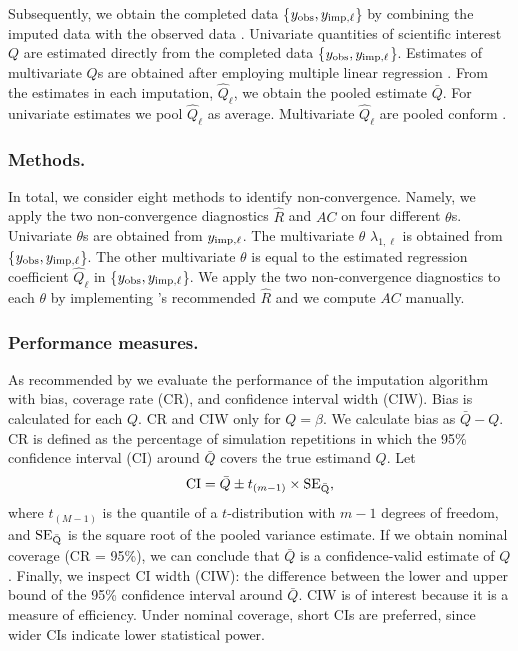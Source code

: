 \documentclass[Royal,times,sageh]{sagej}
\begin{document}
Subsequently, we obtain the completed data \{\(y_{\rm obs}, y_{\rm imp, \ell}\)\} by combining the imputed data with the observed data \citep[function \texttt{mice::complete()};][]{mice}. Univariate quantities of scientific interest \(Q\) are estimated directly from the completed data \{\(y_{\rm obs}, y_{\rm imp, \ell}\)\}. Estimates of multivariate \(Q\)s are obtained after employing multiple linear regression \citep[function \texttt{stats::lm()},][]{R}. From the estimates in each imputation, \(\hat{Q}_\ell\), we obtain the pooled estimate \(\bar{Q}\). For univariate estimates we pool \(\hat{Q}_\ell\) as average. Multivariate \(\hat{Q}_\ell\) are pooled conform \citet{vink14}.

\hypertarget{methods.}{%
\subsubsection{Methods.}\label{methods.}}

In total, we consider eight methods to identify non-convergence. Namely, we apply the two non-convergence diagnostics \(\widehat{R}\) and \(AC\) on four different \(\theta\)s. Univariate \(\theta\)s are obtained from \(y_{\rm imp, \ell}\). The multivariate \(\theta\) \(\lambda_{1,\ell}\) is obtained from \{\(y_{\rm obs}, y_{\rm imp, \ell}\)\}. The other multivariate \(\theta\) is equal to the estimated regression coefficient \(\hat{Q}_\ell\) in \{\(y_{\rm obs}, y_{\rm imp, \ell}\)\}. We apply the two non-convergence diagnostics to each \(\theta\) by implementing \citet{veht19} 's recommended \(\widehat{R}\) and we compute \(AC\) manually.

\hypertarget{performance-measures.}{%
\subsubsection{Performance measures.}\label{performance-measures.}}

As recommended by \citet{buur18} we evaluate the performance of the imputation algorithm with bias, coverage rate (CR), and confidence interval width (CIW). Bias is calculated for each \(Q\). CR and CIW only for \(Q = \beta\).
We calculate bias as \(\bar{Q} - Q\). CR is defined as the percentage of simulation repetitions in which the 95\% confidence interval (CI) around \(\bar{Q}\) covers the true estimand \(Q\). Let
\[\text{CI} = \bar{Q} \pm t_{(m-1)} \times \rm SE_{\bar{Q}},\]
where \(t_{(M-1)}\) is the quantile of a \(t\)-distribution with \(m-1\) degrees of freedom, and \(\rm SE_{\bar{Q}}\) is the square root of the pooled variance estimate. If we obtain nominal coverage (CR = 95\%), we can conclude that \(\bar{Q}\) is a confidence-valid estimate of \(Q\). Finally, we inspect CI width (CIW): the difference between the lower and upper bound of the 95\% confidence interval around \(\bar{Q}\). CIW is of interest because it is a measure of efficiency. Under nominal coverage, short CIs are preferred, since wider CIs indicate lower statistical power.
\end{document}
